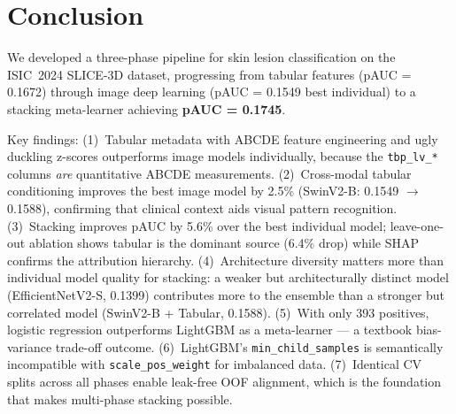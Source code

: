 \documentclass[conference]{IEEEtran}
\begin{document}
\section{Conclusion}

We developed a three-phase pipeline for skin lesion classification
on the ISIC~2024 SLICE-3D dataset, progressing from tabular features
(pAUC = 0.1672) through image deep learning (pAUC = 0.1549 best
individual) to a stacking meta-learner achieving
\textbf{pAUC = 0.1745}.

Key findings:
(1)~Tabular metadata with ABCDE feature engineering and ugly duckling
z-scores outperforms image models individually, because the
\texttt{tbp\_lv\_*} columns \emph{are} quantitative ABCDE measurements.
(2)~Cross-modal tabular conditioning improves the best image model
by 2.5\% (SwinV2-B: 0.1549 $\to$ 0.1588), confirming that clinical
context aids visual pattern recognition.
(3)~Stacking improves pAUC by 5.6\% over the best individual model;
leave-one-out ablation shows tabular is the dominant source (6.4\%
drop) while SHAP confirms the attribution hierarchy.
(4)~Architecture diversity matters more than individual model quality
for stacking: a weaker but architecturally distinct model
(EfficientNetV2-S, 0.1399) contributes more to the ensemble than a
stronger but correlated model (SwinV2-B + Tabular, 0.1588).
(5)~With only 393 positives, logistic regression outperforms LightGBM
as a meta-learner --- a textbook bias-variance trade-off outcome.
(6)~LightGBM's \texttt{min\_child\_samples} is semantically
incompatible with \texttt{scale\_pos\_weight} for imbalanced data.
(7)~Identical CV splits across all phases enable leak-free OOF
alignment, which is the foundation that makes multi-phase stacking
possible.
\end{document}
